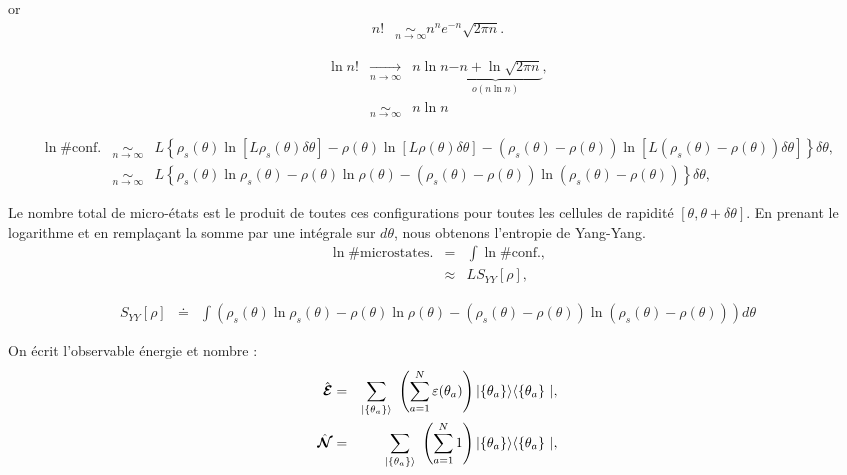 	or 
	\begin{eqnarray}
		n! & \underset{n \to \infty}{\sim} n^n e^{-n} \sqrt{2\pi n}. 
	\end{eqnarray}

	\begin{eqnarray}
		\ln n! & \underset{n \to \infty}{\rightarrow} & n \ln n \underbrace{- n + \ln \sqrt{2 \pi n }}_{o \left ( n \ln n \right ) } ,\\
		&  \underset{n \to \infty}{\sim} & n \ln n  
	\end{eqnarray}

	\begin{eqnarray}
		\ln \# \mbox{conf.} & \underset{n \to \infty}{\sim}   & L \left \{ \rho_s (\theta ) \ln [ L \rho_s ( \theta ) \delta \theta ] -  \rho (\theta ) \ln [ L \rho ( \theta ) \delta \theta ] - ( \rho_s (\theta ) - \rho ( \theta ) )  \ln [ L  ( \rho_s ( \theta ) - \rho ( \theta ) )  \delta \theta ] \right \} \delta \theta ,\\
		& \underset{n \to \infty}{\sim} &  L \left \{ \rho_s (\theta ) \ln \rho_s ( \theta )   -  \rho (\theta ) \ln \rho ( \theta ) - ( \rho_s (\theta ) - \rho ( \theta ) )  \ln   ( \rho_s ( \theta ) - \rho ( \theta ) )   \right \} \delta \theta ,	
	\end{eqnarray}
	
	Le nombre total de micro-états est le produit de toutes ces configurations pour toutes les cellules de rapidité $[\theta, \theta + \delta \theta]$. En prenant le logarithme et en remplaçant la somme par une intégrale sur $d \theta $, nous obtenons l'entropie de Yang-Yang.
	\begin{eqnarray}
		\ln \# \mbox{microstates.} & = & \int \ln \# \mbox{conf.},\\
	 	& \approx  &  L S_{YY} [ \rho ] , 	
	\end{eqnarray}
	
	\begin{eqnarray}
		S_{YY}[\rho] & \doteq & \int  \left ( \rho_s (\theta ) \ln \rho_s ( \theta )   -  \rho (\theta ) \ln \rho ( \theta ) - ( \rho_s (\theta ) - \rho ( \theta ) )  \ln   ( \rho_s ( \theta ) - \rho ( \theta ) )	\right ) d \theta 
	\end{eqnarray}
	
	
	On écrit l'observable énergie et nombre :
	\begin{eqnarray}
		\operator{\mathcal{E}} & = & \sum_{ \vert \{ \theta_a\} \rangle }  \left ( \sum_{a=1}^N  \varepsilon ( \theta_a ) \right )   \vert \{ \theta_a\}\rangle	\langle \{ \theta_a \} \vert, \\
		\operator{\mathcal{N}} & = & \sum_{\vert \{\theta_a\} \rangle }   \left ( \sum_{a=1}^N  1 \right )  \vert \{ \theta_a\}\rangle	\langle \{ \theta_a \} \vert,
	\end{eqnarray}
	
